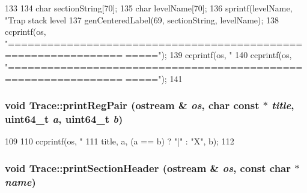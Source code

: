 \begin{DoxyCode}
133 {
134     char sectionString[70];
135     char levelName[70];
136     sprintf(levelName, "Trap stack level %
137     genCenteredLabel(69, sectionString, levelName);
138     ccprintf(os, "===============================================================
      =====\n");
139     ccprintf(os, "%
140     ccprintf(os, "===============================================================
      =====\n");
141 }
\end{DoxyCode}
\hypertarget{namespaceTrace_a268b6c6447c26a1dc793055948257708}{
\subsubsection[{printRegPair}]{\setlength{\rightskip}{0pt plus 5cm}void Trace::printRegPair (ostream \& {\em os}, \/  char const $\ast$ {\em title}, \/  uint64\_\-t {\em a}, \/  uint64\_\-t {\em b})}}
\label{namespaceTrace_a268b6c6447c26a1dc793055948257708}



\begin{DoxyCode}
109 {
110     ccprintf(os, "  %
111             title, a, (a == b) ? "|" : "X", b);
112 }
\end{DoxyCode}
\hypertarget{namespaceTrace_a3111fc48b5ce2a07d14c114691609c08}{
\subsubsection[{printSectionHeader}]{\setlength{\rightskip}{0pt plus 5cm}void Trace::printSectionHeader (ostream \& {\em os}, \/  const char $\ast$ {\em name})}}
\label{namespaceTrace_a3111fc48b5ce2a07d14c114691609c08}



